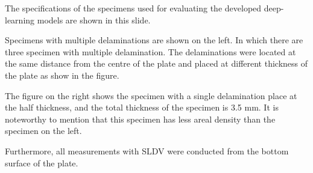 \documentclass[10pt,aspectratio=169,dvipsnames]{beamer} %
\begin{document}
\note
	{	
		\footnotesize
		The specifications of the specimens used for evaluating the developed deep-learning models are shown in this slide.
		
		Specimens with multiple delaminations are shown on the left.
		In which there are three specimen with multiple delamination.
		The delaminations were located at the same distance from the centre of the plate and placed at different thickness of the plate as show in the figure. 
		
		The figure on the right shows the specimen with a single delamination place at the half thickness, and the total thickness of the specimen is 3.5 mm.
		It is noteworthy to mention that this specimen has less areal density than the specimen on the left. 
		
		Furthermore, all measurements with SLDV were conducted from the bottom surface of the plate.
		
		
	}	
\end{document}
